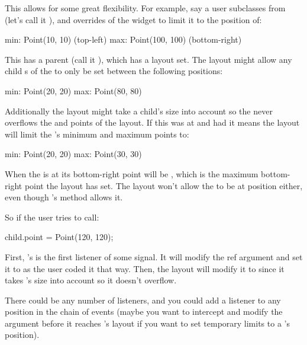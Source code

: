 This allows for some great flexibility. For example, say a user subclasses from  (let's call it ), and overrides  of the widget to limit it to the position of:

\begin{dcode}
min: Point(10, 10) (top-left)
max: Point(100, 100) (bottom-right)
\end{dcode}

This  has a parent  (call it ), which has a layout set. The layout might allow any child s of the  to only be set between the following positions:

\begin{dcode}
min: Point(20, 20)
max: Point(80, 80)
\end{dcode}

Additionally the layout might take a child's size into account so the  never overflows the  and  points of the layout. If this  was at  and had  it means the layout will limit the 's minimum and maximum points to:

\begin{dcode}
min: Point(20, 20)
max: Point(30, 30)
\end{dcode}

When the  is at  its bottom-right point will be , which is the maximum bottom-right point the layout has set. The layout won't allow the  to be at position  either, even though 's  method allows it.

So if the user tries to call:

\begin{dcode}
child.point = Point(120, 120);
\end{dcode}

First, 's  is the first listener of some  signal. It will modify the ref argument and set it to  as the user coded it that way. Then, the layout will modify it to  since it takes 's size into account so it doesn't overflow.

There could be any number of listeners, and you could add a listener to any position in the chain of events (maybe you want to intercept and modify the argument before it reaches 's layout if you want to set temporary limits to a 's position).

